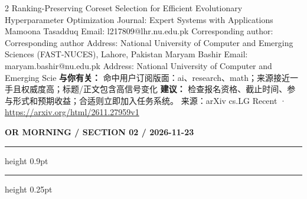 \documentclass[10.5pt]{ctexart}
\begin{document}
\begin{multicols}{2}
Ranking-Preserving Coreset Selection for Efficient Evolutionary Hyperparameter Optimization Journal: Expert Systems with Applications Mamoona Tasadduq Email: l217809@lhr.nu.edu.pk Corresponding author: Corresponding author Address: National University of Computer and Emerging Sciences (FAST-NUCES), Lahore, Pakistan Maryam Bashir Email: maryam.bashir@nu.edu.pk Address: National University of Computer and Emerging Scie
\textbf{与你有关：} 命中用户订阅版面：ai、research、math；来源接近一手且权威度高；标题/正文包含高信号变化
\textbf{建议：} 检查报名资格、截止时间、参与形式和预期收益；合适则立即加入任务系统。
{\footnotesize\color{ormuted} 来源：arXiv cs.LG Recent · \url{https://arxiv.org/html/2611.27959v1}}
\end{multicols}
\newpage
{\small\bfseries OR MORNING / SECTION 02 / 2026-11-23}
\vspace{2mm}
\hrule height 0.9pt
\vspace{1.5mm}
\hrule height 0.25pt
\vspace{4mm}
\end{document}
